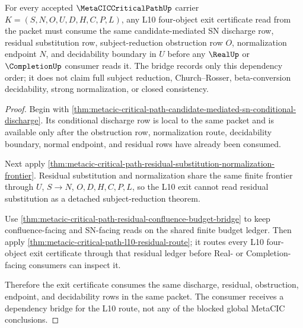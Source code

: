 \begin{theorem}
\label{thm:metacic-critical-path-l10-discharge-dependency-bridge}
For every accepted $\MetaCICCriticalPathUp$ carrier $K=(S,N,O,U,D,H,C,P,L)$, any L10 four-object exit certificate read from the packet must consume the same candidate-mediated SN discharge row, residual substitution row, subject-reduction obstruction row $O$, normalization endpoint $N$, and decidability boundary in $U$ before any $\RealUp$ or $\CompletionUp$ consumer reads it. The bridge records only this dependency order; it does not claim full subject reduction, Church--Rosser, beta-conversion decidability, strong normalization, or closed consistency.
\end{theorem}
\begin{proof}
Begin with \autoref{thm:metacic-critical-path-candidate-mediated-sn-conditional-discharge}. Its conditional discharge row is local to the same packet and is available only after the obstruction row, normalization route, decidability boundary, normal endpoint, and residual rows have already been consumed.

Next apply \autoref{thm:metacic-critical-path-residual-substitution-normalization-frontier}. Residual substitution and normalization share the same finite frontier through $U$, $S \to N$, $O,D,H,C,P,L$, so the L10 exit cannot read residual substitution as a detached subject-reduction theorem.

Use \autoref{thm:metacic-critical-path-residual-confluence-budget-bridge} to keep confluence-facing and SN-facing reads on the shared finite budget ledger. Then apply \autoref{thm:metacic-critical-path-l10-residual-route}; it routes every L10 four-object exit certificate through that residual ledger before Real- or Completion-facing consumers can inspect it.

Therefore the exit certificate consumes the same discharge, residual, obstruction, endpoint, and decidability rows in the same packet. The consumer receives a dependency bridge for the L10 route, not any of the blocked global MetaCIC conclusions.
\end{proof}










